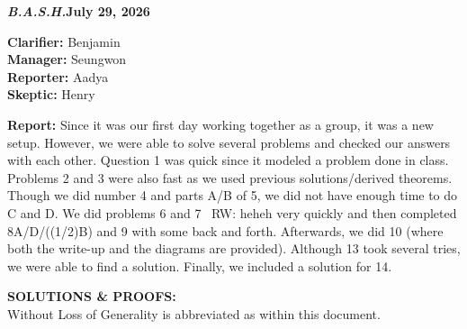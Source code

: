 \documentclass[11pt]{article}
\newcommand{\teamname}{\textit{B.A.S.H.}}
\newcommand{\reportdate}{July 29, 2026}
\begin{document}
    \thispagestyle{firstpage}
    
    \noindent\textbf{\teamname}\hfill\textbf{\reportdate}
    
    \noindent\textbf{Clarifier:} Benjamin\\
    \textbf{Manager:} Seungwon\\
    \textbf{Reporter:} Aadya\\
    \textbf{Skeptic:} Henry
    
    \textbf{Report:} Since it was our first day working together as a group, it was a new setup. However, we were able to solve several problems and checked our answers with each other. Question 1 was quick since it modeled a problem done in class. Problems 2 and 3 were also fast as we used previous solutions/derived theorems. Though we  did number 4 and parts A/B of 5, we did not have enough time to do C and D. We did problems 6 and 7 \color{blue} \ RW: heheh \color{black} very quickly and then completed 8A/D/((1/2)B) and 9 with some back and forth. Afterwards, we did 10 (where both the write-up and the diagrams are provided). Although 13 took several tries, we were able to find a solution. Finally, we included a solution for 14.  
    
    
    \divider
    
    \textbf{SOLUTIONS \& PROOFS:}\\
    Without Loss of Generality is abbreviated as \WLoG{} within this document.
    
\end{document}
